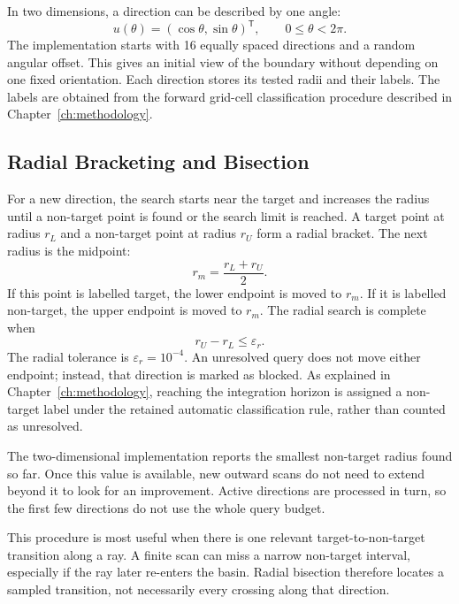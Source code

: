 In two dimensions, a direction can be described by one angle:
\begin{equation}
 u(\theta)=(\cos\theta,\sin\theta)^{\mathsf T},\qquad 0\leq\theta<2\pi.
\end{equation}
The implementation starts with 16 equally spaced directions and a random angular offset. This gives an initial view of the boundary without depending on one fixed orientation. Each direction stores its tested radii and their labels. The labels are obtained from the forward grid-cell classification procedure described in Chapter~\ref{ch:methodology}.

\subsection{Radial Bracketing and Bisection}

For a new direction, the search starts near the target and increases the radius until a non-target point is found or the search limit is reached. A target point at radius $r_L$ and a non-target point at radius $r_U$ form a radial bracket. The next radius is the midpoint:
\begin{equation}
 r_m=\frac{r_L+r_U}{2}.
\end{equation}
If this point is labelled target, the lower endpoint is moved to $r_m$. If it is labelled non-target, the upper endpoint is moved to $r_m$. The radial search is complete when
\begin{equation}
 r_U-r_L\leq\varepsilon_r.
\end{equation}
The radial tolerance is $\varepsilon_r=10^{-4}$. An unresolved query does not move either endpoint; instead, that direction is marked as blocked. As explained in Chapter~\ref{ch:methodology}, reaching the integration horizon is assigned a non-target label under the retained automatic classification rule, rather than counted as unresolved.

The two-dimensional implementation reports the smallest non-target radius found so far. Once this value is available, new outward scans do not need to extend beyond it to look for an improvement. Active directions are processed in turn, so the first few directions do not use the whole query budget.

This procedure is most useful when there is one relevant target-to-non-target transition along a ray. A finite scan can miss a narrow non-target interval, especially if the ray later re-enters the basin. Radial bisection therefore locates a sampled transition, not necessarily every crossing along that direction.

